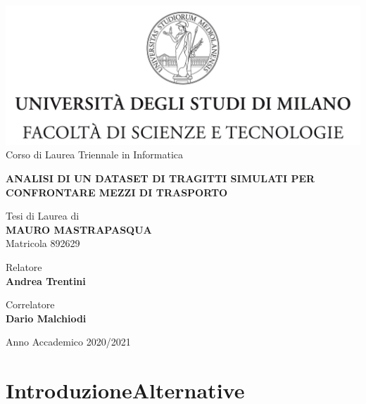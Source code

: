 \documentclass[a4paper,12pt]{report}
\begin{document}
\begin{titlepage}
	\begin{center}
		\includegraphics[width=\textwidth]{Logo.jpg}
		\large{Corso di Laurea Triennale in Informatica}
		
		\vspace{1.4cm}
		
		\Large{\textbf{ANALISI DI UN DATASET DI TRAGITTI SIMULATI PER CONFRONTARE MEZZI DI TRASPORTO}}
		
		\vspace{1.4cm}
		
		\large{Tesi di Laurea di} \\
		\large{\textbf{MAURO MASTRAPASQUA}} \\
		\large{Matricola 892629}
	\end{center}

	\begin{flushleft}
		\vspace{1.4cm}
		
		\normalsize{Relatore} \\
		\normalsize{\textbf{Andrea Trentini}}

		\vspace{0.4cm}

		\normalsize{Correlatore} \\
		\normalsize{\textbf{Dario Malchiodi}}
	\end{flushleft}

	\begin{center}
		\vspace{1.4cm}
		
		\large{Anno Accademico 2020/2021}
	\end{center}
\end{titlepage}

\tableofcontents
\listoftodos

\chapter{IntroduzioneAlternative}

\end{document}
